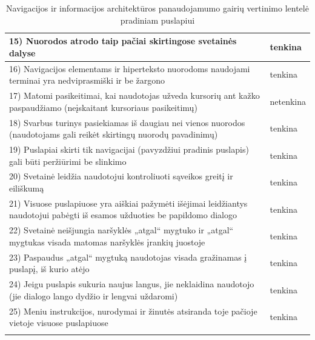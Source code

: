 \documentclass{VUMIFPSkursinis}
\begin{document}
\begin{center}
\begin{longtable}{ |p{}|p{2cm}| }
	15) Nuorodos atrodo taip pačiai skirtingose svetainės dalyse & tenkina \\ \hline
	16) Navigacijos elementams ir hiperteksto nuorodoms naudojami terminai yra nedviprasmiški ir be žargono & tenkina \\ \hline
	17) Matomi pasikeitimai, kai naudotojas užveda kursorių ant kažko paspaudžiamo (neįskaitant kursoriaus pasikeitimų) & netenkina \\ \hline
	18) Svarbus turinys pasiekiamas iš daugiau nei vienos nuorodos (naudotojams gali reikėt skirtingų nuorodų pavadinimų) & tenkina \\ \hline
	19) Puslapiai skirti tik navigacijai (pavyzdžiui pradinis puslapis) gali būti peržiūrimi be slinkimo & tenkina \\ \hline
	20) Svetainė leidžia naudotojui kontroliuoti sąveikos greitį ir eiliškumą & tenkina \\ \hline
	21) Visuose puslapiuose yra aiškiai pažymėti išėjimai leidžiantys naudotojui pabėgti iš esamos užduoties be papildomo dialogo & tenkina \\ \hline
	22) Svetainė neišjungia naršyklės „atgal“ mygtuko ir „atgal“ mygtukas visada matomas naršyklės įrankių juostoje & tenkina \\ \hline
	23) Paspaudus „atgal“ mygtuką naudotojas visada gražinamas į puslapį, iš kurio atėjo & tenkina \\ \hline
	24) Jeigu puslapis sukuria naujus langus, jie neklaidina naudotojo (jie dialogo lango dydžio ir lengvai uždaromi) & tenkina \\ \hline
	25) Meniu instrukcijos, nurodymai ir žinutės atsiranda toje pačioje vietoje visuose puslapiuose & tenkina \\ \hline
	\caption{Navigacijos ir informacijos architektūros panaudojamumo gairių vertinimo lentelė pradiniam puslapiui}\label{navigacijosirIAlentelėPrad}
\end{longtable}
\end{center}
\end{document}
